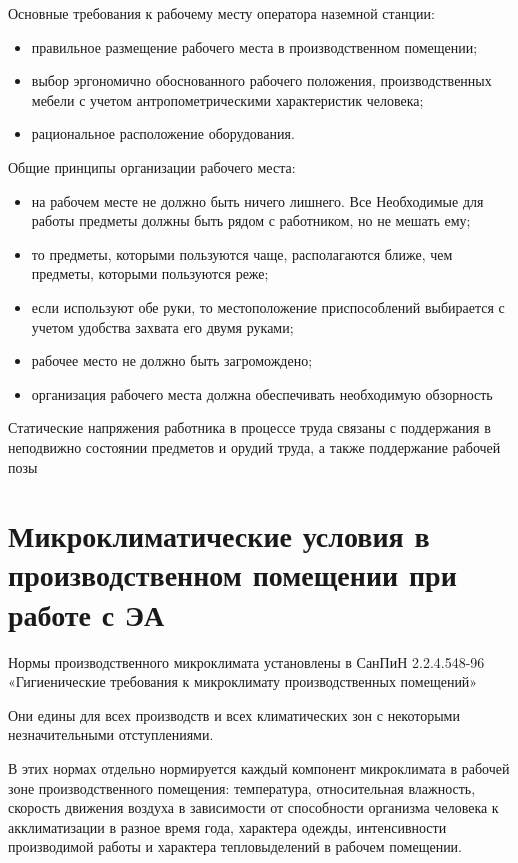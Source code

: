 \documentclass[a4paper,12pt]{report} %
\begin{document}
Основные требования к рабочему месту оператора наземной станции:

\begin{itemize}
\item правильное размещение рабочего места в производственном помещении; 
\item выбор эргономично обоснованного рабочего положения, производственных
  мебели с учетом антропометрическими характеристик человека; 
\item рациональное расположение оборудования. 
\end{itemize}

Общие принципы организации рабочего места:

\begin{itemize}
\item на рабочем месте не должно быть ничего лишнего. Все Необходимые для работы
  предметы должны быть рядом с работником, но не мешать ему; 
\item то предметы, которыми пользуются чаще, располагаются ближе, чем предметы,
  которыми пользуются реже; 
\item если используют обе руки, то местоположение приспособлений выбирается с
  учетом удобства захвата его двумя руками; 
\item рабочее место не должно быть загромождено; 
\item организация рабочего места должна обеспечивать необходимую обзорность 
\end{itemize}

Статические напряжения работника в процессе труда связаны с поддержания в
неподвижно состоянии предметов и орудий труда, а также поддержание рабочей позы 

\section{Микроклиматические условия в производственном
 помещении  при работе с ЭА} 

Нормы производственного микроклимата установлены в СанПиН 2.2.4.548-96
«Гигиенические требования к микроклимату производственных помещений» 

Они едины для всех производств и всех климатических зон с некоторыми
незначительными отступлениями. 

В этих нормах отдельно нормируется каждый компонент микроклимата в рабочей зоне
производственного помещения: температура, относительная влажность, скорость
движения воздуха в зависимости от способности организма человека к
акклиматизации в разное время года, характера одежды, интенсивности производимой
работы и характера тепловыделений в рабочем помещении. 
\end{document}
